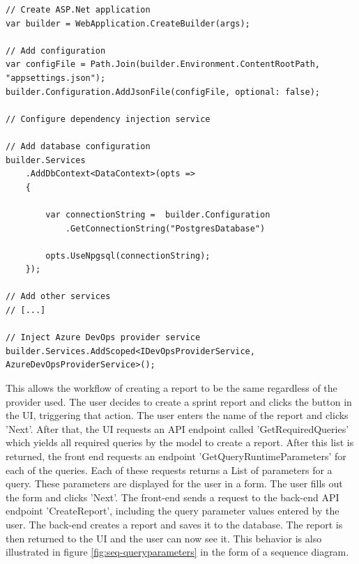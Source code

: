 \begin{lstlisting}[style=csharp, caption=Expression base class, label=lst:devops-injection]
// Create ASP.Net application
var builder = WebApplication.CreateBuilder(args);

// Add configuration
var configFile = Path.Join(builder.Environment.ContentRootPath, "appsettings.json");
builder.Configuration.AddJsonFile(configFile, optional: false);

// Configure dependency injection service

// Add database configuration
builder.Services
    .AddDbContext<DataContext>(opts =>
    {

        var connectionString =  builder.Configuration
            .GetConnectionString("PostgresDatabase")

        opts.UseNpgsql(connectionString);
    });

// Add other services
// [...]
 
// Inject Azure DevOps provider service
builder.Services.AddScoped<IDevOpsProviderService, AzureDevOpsProviderService>();

\end{lstlisting}

This allows the workflow of creating a report to be the same regardless of the provider used. The user decides to create a sprint report and clicks the button in the UI, triggering that action. The user enters the name of the report and clicks 'Next'. After that, the UI requests an API endpoint called 'GetRequiredQueries' which yields all required queries by the model to create a report. 
After this list is returned, the front end requests an endpoint 'GetQueryRuntimeParameters' for each of the queries. Each of these requests returns a List of parameters for a query. These parameters are displayed for the user in a form. The user fills out the form and clicks 'Next'. The front-end sends a request to the back-end API endpoint 'CreateReport', including the query parameter values entered by the user. The back-end creates a report and saves it to the database. The report is then returned to the UI and the user can now see it. This behavior is also illustrated in figure \ref{fig:seq-queryparameters} in the form of a sequence diagram.

